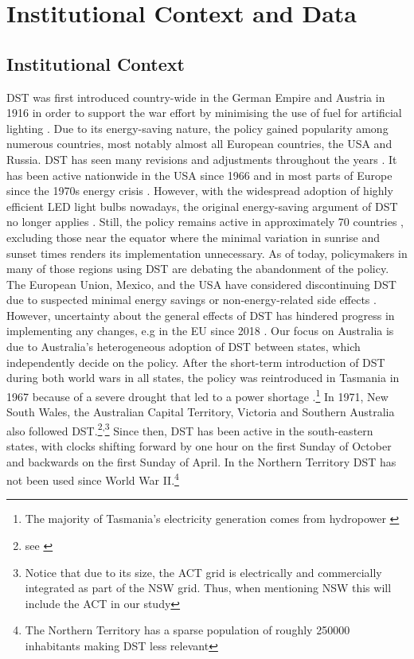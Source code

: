 \section{Institutional Context and Data}
\subsection{Institutional Context}
\ac{DST} was first introduced country-wide in the German Empire and Austria in 1916 in order to support the war effort by minimising the use of fuel for artificial lighting \parencite{Reichsgesetzblatt}. Due to its energy-saving nature, the policy gained popularity among numerous countries, most notably almost all European countries, the \ac{USA} and Russia. \ac{DST} has seen many revisions and adjustments throughout the years \parencite{prerau_book}. It has been active nationwide in the \ac{USA} since 1966 \parencite{Uniform} and in most parts of Europe since the 1970s energy crisis \parencite{pearce_great_2017}.  
However, with the widespread adoption of highly efficient LED light bulbs nowadays, the original energy-saving argument of \ac{DST} no longer applies \parencite{aries_effect_2008}.
Still, the policy remains active in approximately 70 countries \parencite{prerau_book}, excluding those near the equator where the minimal variation in sunrise and sunset times renders its implementation unnecessary. As of today, policymakers in many of those regions using \ac{DST} are debating the abandonment of the policy. The European Union, Mexico, and the \ac{USA} have considered discontinuing DST due to suspected minimal energy savings or non-energy-related side effects \parencite{guven, mexico_congress, congress}. However, uncertainty about the general effects of DST has hindered progress in implementing any changes, e.g in the EU since 2018 \parencite{eu_directive}.
\newline
Our focus on Australia is due to Australia's heterogeneous adoption of \ac{DST} between states, which independently decide on the policy. After the short-term introduction of DST during both world wars in all states, the policy was reintroduced in Tasmania in 1967 because of a severe drought that led to a power shortage \parencite{Tasmania}.\footnote{The majority of Tasmania's electricity generation comes from hydropower \parencite{aemc_tas}}
In 1971, New South Wales, the Australian Capital Territory, Victoria and Southern Australia also followed \ac{DST}.\footnote{see \cite{NewSouthWales, ACP, Victoria, SouthernAustralia}}\textsuperscript{,}\footnote{Notice that due to its size, the ACT grid is electrically and commercially integrated as part of the NSW grid. Thus, when mentioning NSW this will include the ACT in our study} Since then, \ac{DST} has been active in the south-eastern states, with clocks shifting forward by one hour on the first Sunday of October and backwards on the first Sunday of April. In the Northern Territory \ac{DST} has not been used since World War II.\footnote{The Northern Territory has a sparse population of roughly 250000 inhabitants \parencite{nt_pop} making \ac{DST} less relevant}
